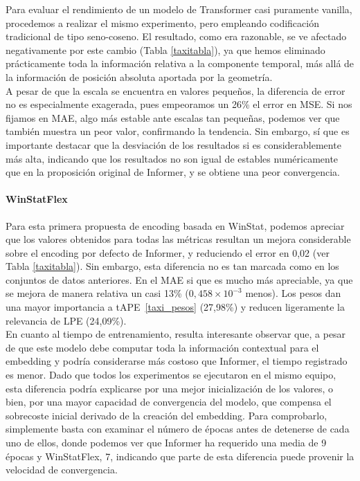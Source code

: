 Para evaluar el rendimiento de un modelo de Transformer casi puramente vanilla, procedemos a realizar el mismo experimento, pero empleando codificación tradicional de tipo seno-coseno. El resultado, como era razonable, se ve afectado negativamente por este cambio (Tabla \ref{taxitabla}), ya que hemos eliminado prácticamente toda la información relativa a la componente temporal, más allá de la información de posición absoluta aportada por la geometría.\\

A pesar de que la escala se encuentra en valores pequeños, la diferencia de error no es especialmente exagerada, pues empeoramos un 26\% el error en MSE. Si nos fijamos en MAE, algo más estable ante escalas tan pequeñas, podemos ver que también muestra un peor valor, confirmando la tendencia. Sin embargo, sí que es importante destacar que la desviación de los resultados si es considerablemente más alta, indicando que los resultados no son igual de estables numéricamente que en la proposición original de Informer, y se obtiene una peor convergencia.\\

\paragraph{WinStatFlex}

Para esta primera propuesta de encoding basada en WinStat, podemos apreciar que los valores obtenidos para todas las métricas resultan un mejora considerable sobre el encoding por defecto de Informer, y reduciendo el error en 0,02 (ver Tabla \ref{taxitabla}). Sin embargo, esta diferencia no es tan marcada como en los conjuntos de datos anteriores. En el MAE si que es mucho más apreciable, ya que se mejora de manera relativa un casi 13\% ($0,458 \times 10^{-3}$ menos). Los pesos dan una mayor importancia a tAPE~\ref{taxi_pesos} (27,98\%) y reducen ligeramente la relevancia de LPE (24,09\%).\\ 

En cuanto al tiempo de entrenamiento, resulta interesante observar que, a pesar de que este modelo debe computar toda la información contextual para el embedding y podría considerarse más costoso que Informer, el tiempo registrado es menor. Dado que todos los experimentos se ejecutaron en el mismo equipo, esta diferencia podría explicarse por una mejor inicialización de los valores, o bien, por una mayor capacidad de convergencia del modelo, que compensa el sobrecoste inicial derivado de la creación del embedding. Para comprobarlo, simplemente basta con examinar el número de épocas antes de detenerse de cada uno de ellos, donde podemos ver que Informer ha requerido una media de 9 épocas y WinStatFlex, 7, indicando que parte de esta diferencia puede provenir la velocidad de convergencia. 

